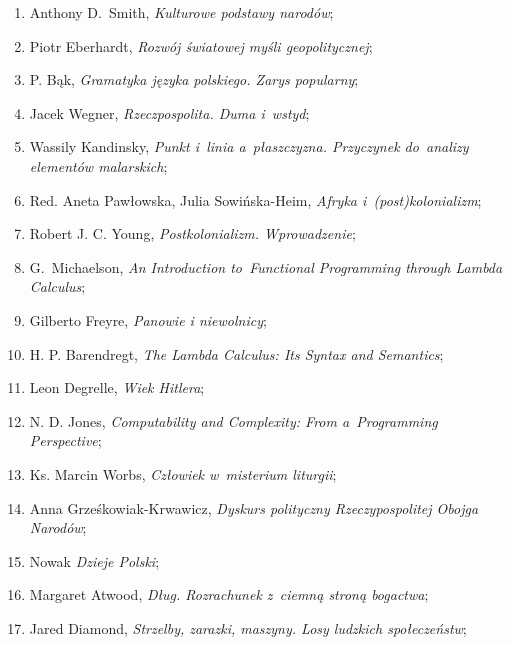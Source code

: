 \documentclass[a4paper,11pt]{article}
\begin{document}
\begin{enumerate}
\item Anthony D.~Smith, \emph{Kulturowe podstawy narodów};

\item Piotr Eberhardt, \emph{Rozwój światowej myśli geopolitycznej};

\item P. Bąk, \emph{Gramatyka języka polskiego. Zarys popularny};

\item Jacek Wegner, \emph{Rzeczpospolita. Duma i~wstyd};

\item Wassily Kandinsky, \emph{Punkt i~linia a~płaszczyzna. Przyczynek
    do~analizy elementów malarskich};

\item Red. Aneta Pawłowska, Julia Sowińska-Heim, \emph{Afryka
    i~(post)kolonializm};

\item Robert J. C. Young, \emph{Postkolonializm. Wprowadzenie};

\item G.~Michaelson, \emph{An Introduction to~Functional Programming
    through Lambda Calculus};

\item Gilberto Freyre, \emph{Panowie i niewolnicy};

\item H. P. Barendregt, \emph{The Lambda Calculus: Its Syntax and
    Semantics};

\item Leon Degrelle, \emph{Wiek Hitlera};

\item N. D. Jones, \emph{Computability and Complexity: From
    a~Programming Perspective};

\item Ks. Marcin Worbs, \emph{Człowiek w~misterium liturgii};

\item Anna Grześkowiak-Krwawicz, \emph{Dyskurs polityczny
    Rzeczypospolitej Obojga Narodów};

\item Nowak \emph{Dzieje Polski};

\item Margaret Atwood, \emph{Dług. Rozrachunek z~ciemną stroną
    bogactwa};

\item Jared Diamond, \emph{Strzelby, zarazki, maszyny. Losy ludzkich
    społeczeństw};


\end{enumerate}
\end{document}
